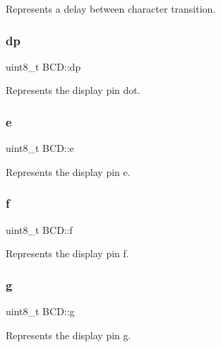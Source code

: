 Represents a delay between character transition. 

\mbox{\label{structBCD_a2a88e8f3a8147a01b12e3393b4b034c2}} 
\subsubsection{\texorpdfstring{dp}{dp}}
{\footnotesize\ttfamily uint8\+\_\+t B\+C\+D\+::dp}



Represents the display pin \textquotesingle{}dot\textquotesingle{}. 

\mbox{\label{structBCD_ac48c12d16a3111700c6a67f46db7ea1f}} 
\subsubsection{\texorpdfstring{e}{e}}
{\footnotesize\ttfamily uint8\+\_\+t B\+C\+D\+::e}



Represents the display pin \textquotesingle{}e\textquotesingle{}. 

\mbox{\label{structBCD_abd6ad9ecd210b3f8d15a269526534a10}} 
\subsubsection{\texorpdfstring{f}{f}}
{\footnotesize\ttfamily uint8\+\_\+t B\+C\+D\+::f}



Represents the display pin \textquotesingle{}f\textquotesingle{}. 

\mbox{\label{structBCD_a84dac73393cccf960f31340c034aee2e}} 
\subsubsection{\texorpdfstring{g}{g}}
{\footnotesize\ttfamily uint8\+\_\+t B\+C\+D\+::g}



Represents the display pin \textquotesingle{}g\textquotesingle{}. 

\mbox{\label{structBCD_a6daf4f1f982e97a20852eedd79f4d619}} 
